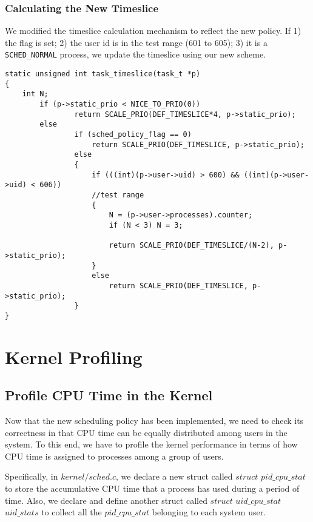 \documentclass[11pt]{article}
\begin{document}
\subsubsection{Calculating the New Timeslice}
We modified the timeslice calculation mechanism to reflect the new policy. If 1) the flag is set; 2) the user id is in the test range (601 to 605); 3) it is a \texttt{SCHED\_NORMAL} process, we update the timeslice using our new scheme.
\begin{lstlisting}[style=CStyle]
static unsigned int task_timeslice(task_t *p)
{
    int N;
        if (p->static_prio < NICE_TO_PRIO(0))
                return SCALE_PRIO(DEF_TIMESLICE*4, p->static_prio);
        else
                if (sched_policy_flag == 0)
                    return SCALE_PRIO(DEF_TIMESLICE, p->static_prio);
                else
                {
                    if (((int)(p->user->uid) > 600) && ((int)(p->user->uid) < 606)) 
                    //test range
                    {
                        N = (p->user->processes).counter;
                        if (N < 3) N = 3;
                        
                        return SCALE_PRIO(DEF_TIMESLICE/(N-2), p->static_prio);
                    }
                    else
                        return SCALE_PRIO(DEF_TIMESLICE, p->static_prio);
                }
}
\end{lstlisting}

\section{Kernel Profiling}

\subsection{Profile CPU Time in the Kernel}
Now that the new scheduling policy has been implemented, we need to check its correctness in that CPU time can be equally distributed among users in the system. To this end, we have to profile the kernel performance in terms of how CPU time is assigned to processes among a group of users.  

Specifically, in $kernel/sched.c$, we declare a new struct called $struct$ $pid\_cpu\_stat$ to store the accumulative CPU time that a process has used during a period of time. Also, we declare and define another struct called $struct$ $uid\_cpu\_stat$ $uid\_stats$ to collect all the $pid\_cpu\_stat$ belonging to each system user. 
\end{document}
